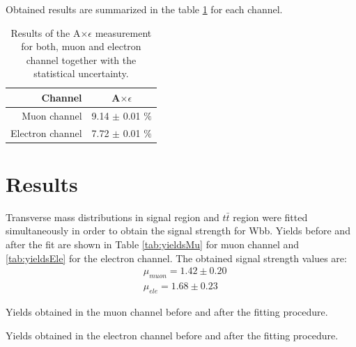 Obtained results are summarized in the table \ref{tab:AE} for each channel.

\begin{table}[!htb]
\begin{center}
   \begin{tabular} {r c} \hline \hline
        Channel         & A$\times \epsilon$ \\
        \hline
        Muon channel         & 9.14 $\pm$ 0.01 $\%$ \\
        Electron channel     & 7.72 $\pm$ 0.01 $\%$ \\
        \hline\hline
   \end{tabular}
\caption{Results of the A$\times \epsilon$ measurement for both, muon and electron channel together with the statistical uncertainty.}
\label{tab:AE}
\end{center}
\end{table}




\section{Results}
\label{sec:res}

Transverse mass distributions in signal region and $t\bar{t}$ region were fitted simultaneously in order to obtain the signal strength for Wbb. Yields before and after the fit are shown in Table \ref{tab:yieldsMu} for muon channel and \ref{tab:yieldsEle} for the electron channel. The obtained signal strength values are:
\begin{align*}
&\mu_{muon} = 1.42 \pm 0.20 \\
&\mu_{ele} = 1.68 \pm 0.23
\end{align*}


\begin{table}[h!]
\caption{Yields obtained in the muon channel before and after the fitting procedure.}
\label{tab:yieldsMu}

\end{table}
\begin{table}[h!]
\caption{Yields obtained in the electron channel before and after the fitting procedure.}
\label{tab:yieldsEle}

\end{table}

